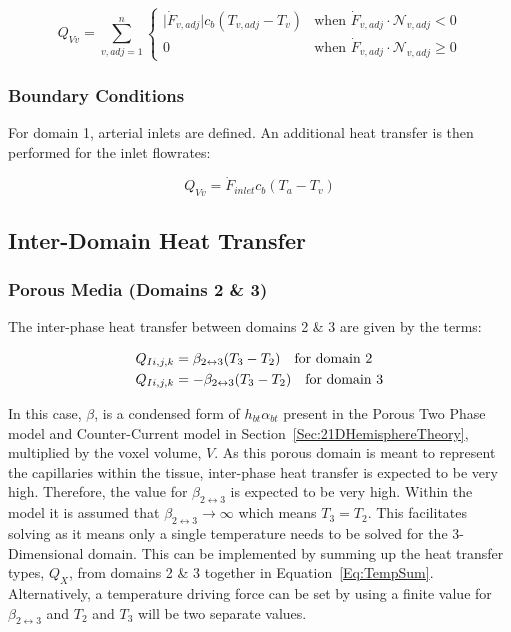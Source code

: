 \documentclass[11pt,english,a4paper,twoside,openright]{report}
\begin{document}
{{{{{{{{\begin{equation}
Q_{Vv}=\sum_{v,adj=1}^{n}
\begin{cases}
\lvert \dot{F}_{v,adj}\rvert c_{b}(T_{v,adj}-T_{v}) & \text{when $\dot{F}_{v,adj}\cdot \mathcal{N}_{v,adj} < 0$} \\
0 & \text{when $\dot{F}_{v,adj}\cdot \mathcal{N}_{v,adj} \geq 0$}
\end{cases}
\end{equation}

\subsubsection{Boundary Conditions}

For domain 1, arterial inlets are defined. An additional heat transfer is then performed for the inlet flowrates:

\begin{equation}
Q_{Vv}=\dot{F}_{inlet}c_{b}(T_{a}-T_{v})
\end{equation}

\subsection{Inter-Domain Heat Transfer}
\subsubsection{Porous Media (Domains 2 \& 3)}

The inter-phase heat transfer between domains 2 \& 3 are given by the terms:

\begin{equation}
\begin{split}
Q_{Ii,j,k} &= \beta_{2\leftrightarrow3}(T_{3}-T_{2}) \text{\quad for domain 2} \\
Q_{Ii,j,k} &= -\beta_{2\leftrightarrow3}(T_{3}-T_{2}) \text{\quad for domain 3} \\
\end{split}
\end{equation} 

In this case, $\beta$, is a condensed form of $h_{bt}\alpha_{bt}$ present in the Porous Two Phase model and Counter-Current model in Section~\ref{Sec:21DHemisphereTheory}, multiplied by the voxel volume, $V$. As this porous domain is meant to represent the capillaries within the tissue, inter-phase heat transfer is expected to be very high. Therefore, the value for $\beta_{2\leftrightarrow3}$ is expected to be very high. Within the model it is assumed that $\beta_{2\leftrightarrow3}\rightarrow\infty$ which means $T_{3}=T_{2}$. This facilitates solving as it means only a single temperature needs to be solved for the 3-Dimensional domain. This can be implemented by summing up the heat transfer types, $Q_{X}$, from domains 2 \& 3 together in Equation~\ref{Eq:TempSum}. Alternatively, a temperature driving force can be set by using a finite value for $\beta_{2\leftrightarrow3}$ and $T_{2}$ and $T_{3}$ will be two separate values.

}}}}}}}}
\end{document}
